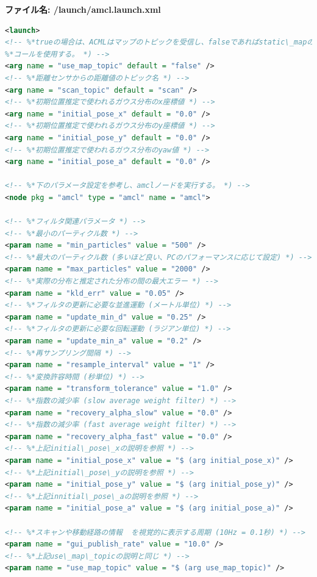 \textbf{ファイル名: /launch/amcl.launch.xml}
\begin{lstlisting}[language=XML]
<launch>
<!-- %*trueの場合は、ACMLはマップのトピックを受信し、falseであればstatic\_mapのサービス*)
%*コールを使用する。 *) -->
<arg name = "use_map_topic" default = "false" />
<!-- %*距離センサからの距離値のトピック名 *) -->
<arg name = "scan_topic" default = "scan" />
<!-- %*初期位置推定で使われるガウス分布のx座標値 *) -->
<arg name = "initial_pose_x" default = "0.0" />
<!-- %*初期位置推定で使われるガウス分布のy座標値 *) -->
<arg name = "initial_pose_y" default = "0.0" />
<!-- %*初期位置推定で使われるガウス分布のyaw値 *) -->
<arg name = "initial_pose_a" default = "0.0" />

<!-- %*下のパラメータ設定を参考し、amclノードを実行する。 *) -->
<node pkg = "amcl" type = "amcl" name = "amcl">

<!-- %*フィルタ関連パラメータ *) -->
<!-- %*最小のパーティクル数 *) -->
<param name = "min_particles" value = "500" />
<!-- %*最大のパーティクル数 (多いほど良い、PCのパフォーマンスに応じて設定) *) -->
<param name = "max_particles" value = "2000" />
<!-- %*実際の分布と推定された分布の間の最大エラー *) -->
<param name = "kld_err" value = "0.05" />
<!-- %*フィルタの更新に必要な並進運動 (メートル単位) *) -->
<param name = "update_min_d" value = "0.25" />
<!-- %*フィルタの更新に必要な回転運動 (ラジアン単位) *) -->
<param name = "update_min_a" value = "0.2" />
<!-- %*再サンプリング間隔 *) -->
<param name = "resample_interval" value = "1" />
<!-- %*変換許容時間 (秒単位) *) -->
<param name = "transform_tolerance" value = "1.0" />
<!-- %*指数の減少率 (slow average weight filter) *) -->
<param name = "recovery_alpha_slow" value = "0.0" />
<!-- %*指数の減少率 (fast average weight filter) *) -->
<param name = "recovery_alpha_fast" value = "0.0" />
<!-- %*上記initial\_pose\_xの説明を参照 *) -->
<param name = "initial_pose_x" value = "$ (arg initial_pose_x)" />
<!-- %*上記initial\_pose\_yの説明を参照 *) -->
<param name = "initial_pose_y" value = "$ (arg initial_pose_y)" />
<!-- %*上記innitial\_pose\_aの説明を参照 *) -->
<param name = "initial_pose_a" value = "$ (arg initial_pose_a)" />

<!-- %*スキャンや移動経路の情報  を視覚的に表示する周期 (10Hz = 0.1秒) *) -->
<param name = "gui_publish_rate" value = "10.0" />
<!-- %*上記use\_map\_topicの説明と同じ *) -->
<param name = "use_map_topic" value = "$ (arg use_map_topic)" />


\end{lstlisting}
